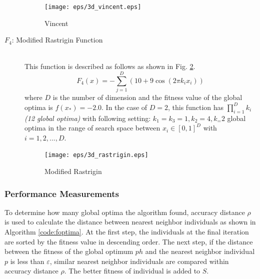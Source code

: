 \documentclass[conference]{IEEEtran}
\begin{document}
\begin{description}
\begin{figure}[h]
\begin{center}
	\texttt{[image: eps/3d\_vincent.eps]}
\caption{Vincent}
\label{fig:f3}
\end{center}
\end{figure}

\item[$F_4$: Modified Rastrigin Function]\mbox{}\\
 This function is described as follows as shown in Fig. \ref{fig:f4}.
 \begin{equation}
F_4(x) = -\sum_{j=1}^D (10+9 \cos(2 \pi k_i x_i)) 
\end{equation}
where $D$ is the number of dimension and the fitness value of the global optima is ${f(x_*)=-2.0}$. In the case of $D=2$, this function has $\prod_{i=1}^D k_i$ \textit{(12 global optima)} with following setting: $k_1=k_3=1, k_2=4, k_=2$  global optima in the range of search space between $x_i \in [0, 1]^D$ with $i=1,2,...,D$.

\begin{figure}[h]
\begin{center}
	\texttt{[image: eps/3d\_rastrigin.eps]}
\caption{Modified Rastrigin}
\label{fig:f4}
\end{center}
\end{figure}

\end{description}

\subsubsection{Performance Measurements}
To determine how many global optima the algorithm found, accuracy distance $\rho$ is used to calculate the distance between nearest neighbor individuals as shown in Algorithm \ref{code:foptima}. At the first step, the individuals at the final iteration are sorted by the fitness value in descending order. The next step, if the distance between the fitness of the global optimum $ph$ and the nearest neighbor individual $p$ is less than $\varepsilon$, similar nearest neighbor individuals are compared within accuracy distance $\rho$. The better fitness of individual is added to $S$.
\end{document}
